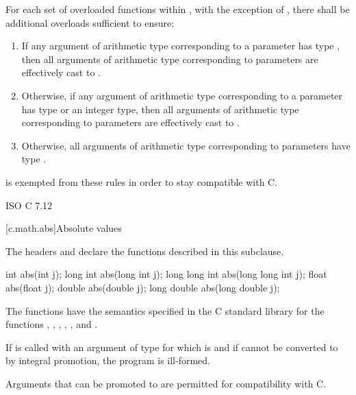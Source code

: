 \pnum
For each set of overloaded functions within ,
with the exception of ,
there shall be additional overloads sufficient to ensure:
\begin{enumerate}
  \item If any argument of arithmetic type
    corresponding to a  parameter
    has type ,
    then all arguments of arithmetic type
    corresponding to  parameters
    are effectively cast to .
  \item Otherwise, if any argument of arithmetic type
    corresponding to a  parameter
    has type 
    or an integer type,
    then all arguments of arithmetic type
    corresponding to  parameters
    are effectively cast to .
  \item Otherwise, all arguments of arithmetic type
    corresponding to  parameters
    have type .
\end{enumerate}
\begin{note}
 is exempted from these rules in order to stay compatible with C.
\end{note}

\xref
ISO C 7.12

[c.math.abs]{Absolute values}

\pnum
{}%
%
\begin{note}
The headers  and
declare the functions described in this subclause.
\end{note}

%
\begin{itemdecl}
int abs(int j);
long int abs(long int j);
long long int abs(long long int j);
float abs(float j);
double abs(double j);
long double abs(long double j);
\end{itemdecl}

\begin{itemdescr}
\pnum
\effects
The 
functions have the semantics specified in the C standard library
for the functions , , ,
, , and .

\pnum
\remarks
If  is called with an argument of type 
for which  is  and
if  cannot be converted to 
by integral promotion, the program is ill-formed.
\begin{note}
Arguments that can be promoted to  are permitted for compatibility with C.
\end{note}
\end{itemdescr}

